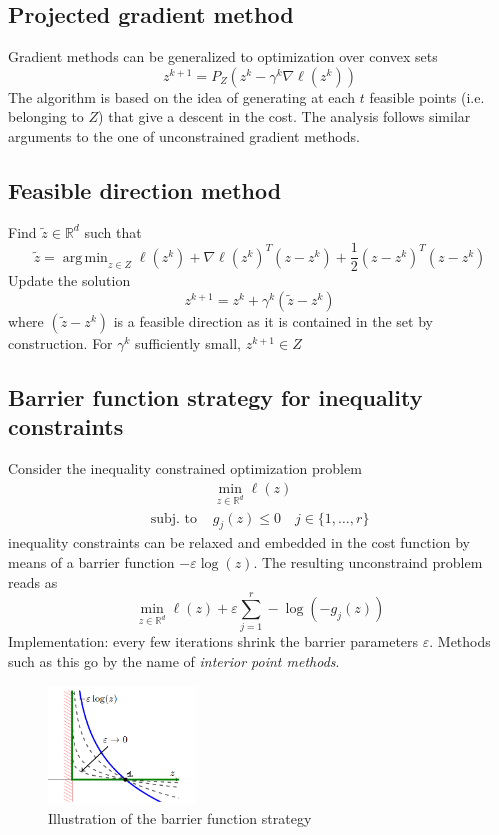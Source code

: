 \documentclass[openany]{book}
\DeclareMathOperator*{\argmin}{arg\,min}   %
\newcommand{\R}{\mathbb{R}}                %
\theoremstyle{definition}
\theoremstyle{remark}
\begin{document}
\subsection{Projected gradient method}

Gradient methods can be generalized to optimization over convex sets 
\[
    z^{k+1}=P_Z(z^k-\gamma^k\nabla\ell(z^k))
\]
The algorithm is based on the idea of generating at each $t$ feasible points (i.e. belonging to $Z$) that give a descent in the cost. The analysis follows similar arguments to the one of unconstrained gradient methods.

\subsection{Feasible direction method}

Find $\tilde{z}\in\R^d$ such that 
\[
    \tilde{z} = \argmin_{z\in Z} \ell(z^k)+\nabla\ell(z^k)^T(z-z^k)+\displaystyle\frac{1}{2}(z-z^k)^T(z-z^k)
\]
Update the solution 
\[
    z^{k+1}=z^k+\gamma^k(\tilde{z}-z^k)
\]
where $(\tilde{z}-z^k)$ is a feasible direction as it is contained in the set by construction. For $\gamma^k$ sufficiently small, $z^{k+1}\in Z$

\subsection{Barrier function strategy for inequality constraints}

Consider the inequality constrained optimization problem 
\begin{align*}
    &\min_{z\in\R^d}\ell(z)\\
    \text{subj. to } &g_j(z)\leq 0 \quad j\in \{1,\dots,r\}
\end{align*}  
inequality constraints can be relaxed and embedded in the cost function by means of a barrier function $-\varepsilon \log(z)$. The resulting unconstraind problem reads as 
\[
    \min_{z\in\R^d} \ell(z) + \varepsilon \displaystyle\sum_{j=1}^{r}-\log(-g_j(z))
\]
Implementation: every few iterations shrink the barrier parameters $\varepsilon$.
Methods such as this go by the name of \emph{interior point methods}.
\begin{figure}[ht]
    \centering
    \includegraphics[width=0.35\textwidth]{barrier}
    \caption{Illustration of the barrier function strategy}
\end{figure}
\end{document}
